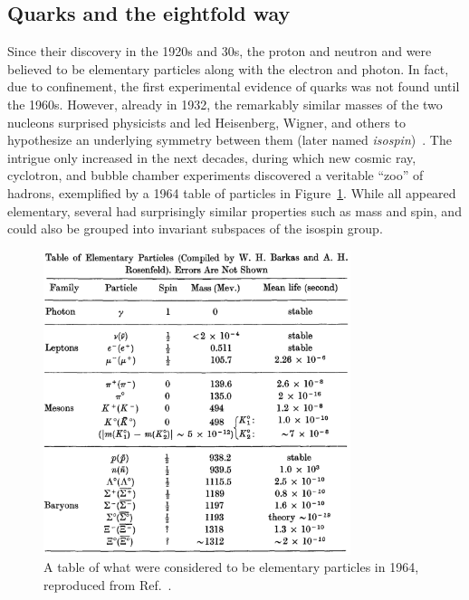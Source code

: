 \subsection{Quarks and the eightfold way}
\label{sec:01_sm_quarks}

Since their discovery in the 1920s and 30s, the proton and neutron and were believed to be elementary particles along with the electron and photon.
In fact, due to confinement, the first experimental evidence of quarks was not found until the 1960s.
However, already in 1932, the remarkably similar masses of the two nucleons surprised physicists and led Heisenberg, Wigner, and others to hypothesize an underlying \SU[2] symmetry between them (later named \textit{isospin})~\cite{Heisenberg1932, Wigner1937}.
The intrigue only increased in the next decades, during which new cosmic ray, cyclotron, and bubble chamber experiments discovered a veritable ``zoo'' of hadrons, exemplified by a 1964 table of particles in Figure~\ref{fig:01_sm_qcd_particle_zoo}.
While all appeared elementary, several had surprisingly similar properties such as mass and spin, and could also be grouped into invariant subspaces of the isospin group.

\begin{figure}[ht]
	\centering
	\includegraphics[width=0.8\textwidth]{figures/01-SM-03-SM/qcd/table_elementary_particles_sakurai.png}
	\caption{A table of what were considered to be elementary particles in 1964, reproduced from Ref.~\cite{Sakurai:2015gmk}.}
	\label{fig:01_sm_qcd_particle_zoo}
\end{figure}


